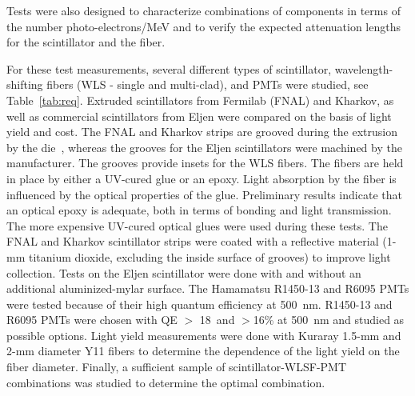 Tests were also designed to characterize combinations of components in
terms of the number photo-electrons/MeV and to verify the expected 
attenuation lengths for the scintillator and the fiber.

For these test measurements, several different types of scintillator,
wavelength-shifting fibers (WLS - single and multi-clad), and PMTs were 
studied, see Table~\ref{tab:req}.  Extruded scintillators from Fermilab (FNAL) 
and Kharkov, as well as commercial scintillators from Eljen were compared on 
the basis of light yield and cost.  The FNAL and Kharkov strips are grooved 
during the extrusion by the die~\cite{fnalex,yerex}, whereas the grooves for 
the Eljen scintillators were machined by the manufacturer.  The grooves 
provide insets for the WLS fibers.  The fibers are held in place by either a 
UV-cured glue or an epoxy.  Light absorption by the fiber is influenced by 
the optical properties of the glue.  Preliminary results indicate that an 
optical epoxy is adequate, both in terms of bonding and light transmission. 
The more expensive UV-cured optical glues were used during these tests.  The 
FNAL and Kharkov scintillator strips were coated with a reflective material 
(1-mm titanium dioxide, excluding the inside surface of grooves) to improve 
light collection.  Tests on the Eljen scintillator were done with and without 
an additional aluminized-mylar surface. The Hamamatsu R1450-13 and R6095 PMTs 
were tested because of their high quantum efficiency at 500~nm.  R1450-13
and R6095 PMTs were chosen with QE $>$ 18\ and $>$16\% at 500~nm and studied 
as possible options.  Light yield measurements were done with Kuraray 1.5-mm 
and 2-mm diameter Y11 fibers to determine the dependence of the light yield 
on the fiber diameter.  Finally, a sufficient sample of scintillator-WLSF-PMT 
combinations was studied to determine the optimal combination.

